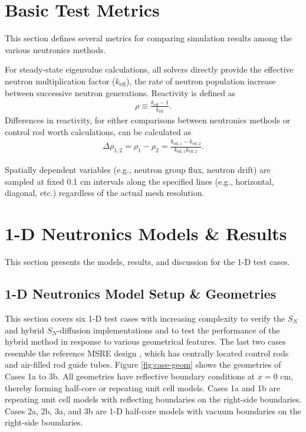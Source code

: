 \section{Basic Test Metrics} \label{sec:test-metrics}

This section defines several metrics for comparing simulation results among the various
neutronics methods.

For steady-state eigenvalue calculations, all solvers directly provide the effective neutron
multiplication factor ($k_\text{eff}$), the rate of neutron population increase between successive
neutron generations. Reactivity is defined as
%
\begin{gather}
  \rho \equiv \frac{k_\text{eff}-1}{k_\text{eff}}.
\end{gather}
%
Differences in reactivity, for either comparisons between neutronics methods or control rod worth
calculations, can be calculated as
%
\begin{gather}
  \Delta\rho_{1,2} = \rho_1 - \rho_2 =
  \frac{k_{\text{eff},1}-k_{\text{eff},2}}{k_{\text{eff},1}k_{\text{eff},2}}.
\end{gather}

Spatially dependent variables (e.g., neutron group flux, neutron drift) are sampled at fixed 0.1 cm
intervals along the specified lines (e.g., horizontal, diagonal, etc.) regardless of the actual
mesh resolution.

\section{1-D Neutronics Models \& Results} \label{sec:1d-results}

This section presents the models, results, and discussion for the 1-D test cases.

\subsection{1-D Neutronics Model Setup \& Geometries}

This section covers six 1-D test cases with increasing complexity to verify the $S_N$ and hybrid
$S_N$-diffusion implementations and to test the performance of the hybrid
method in response to various geometrical features. The last two cases resemble the
reference \gls{MSRE} design \cite{robertson_msre_1965}, which has centrally located control rods
and air-filled rod guide tubes. Figure \ref{fig:case-geom} shows the geometries of Cases 1a to
3b. All geometries have reflective boundary conditions at $x=0$ cm, thereby
forming half-core or repeating unit cell models. Cases 1a and 1b are repeating unit
cell models with reflecting boundaries on the right-side boundaries. Cases 2a, 2b, 3a, and 3b
are 1-D half-core models with vacuum boundaries on the right-side boundaries.

